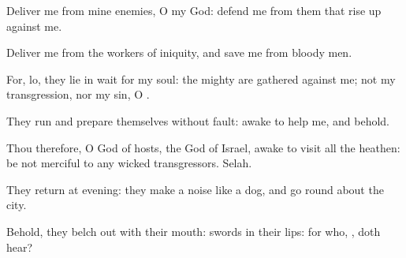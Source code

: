 {\Q {}Deliver me from mine
enemies, O my
God:
defend me from them that rise
up against me.


\par }{\Q {}Deliver me from the
workers of
iniquity, and
save me from
bloody
men.


\par }{\Q {}For, lo, they lie in
wait for my
soul: the
mighty are
gathered against me; not
{} my
transgression, nor
{} my
sin, O
{}.


\par }{\Q {}They
run and
prepare themselves without
{}
fault:
awake to
help me, and
behold.


\par }{\Q {}Thou therefore, O
{}
God of
hosts, the
God of
Israel,
awake to
visit all the
heathen: be not
merciful to any
wicked
transgressors.
Selah.


\par }{\Q {}They
return at
evening: they make a
noise like a
dog, and go round
about the
city.


\par }{\Q {}Behold, they belch
out with their
mouth:
swords
{} in their
lips: for who,
{}, doth
hear?


\par }{\BB \par }
